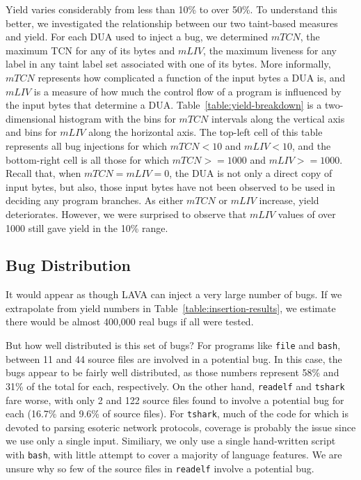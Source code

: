 Yield varies considerably from less than 10\% to over 50\%.
To understand this better, we investigated the relationship between our two taint-based measures and yield.
For each DUA used to inject a bug, we determined $mTCN$, the maximum TCN for any of its bytes and $mLIV$, the maximum liveness for any label in any taint label set associated with one of its bytes.  
More informally, $mTCN$ represents how complicated a function of the input bytes a DUA is, and $mLIV$ is a measure of how much the control flow of a program is influenced by the input bytes that determine a DUA.
Table~\ref{table:yield-breakdown} is a two-dimensional histogram with the bins for $mTCN$ intervals along the vertical axis and bins for $mLIV$ along the horizontal axis.
The top-left cell of this table represents all bug injections for which $mTCN<10$ and $mLIV<10$, and the bottom-right cell is all those for which $mTCN>=1000$ and $mLIV>=1000$.
Recall that, when  $mTCN=mLIV=0$, the DUA is not only a direct copy of input bytes, but also, those input bytes have not been observed to be used in deciding any program branches. 
As either $mTCN$ or $mLIV$ increase, yield deteriorates.  
However, we were surprised to observe that $mLIV$ values of over 1000 still gave yield in the 10\% range.

\subsection{Bug Distribution}

It would appear as though LAVA can inject a very large number of bugs.  
If we extrapolate from yield numbers in Table~\ref{table:insertion-results}, we estimate there would be almost 400,000 real bugs if all were tested.

\noindent
But how well distributed is this set of bugs? 
For programs like \verb+file+ and \verb+bash+, between 11 and 44 source files  are involved in a potential bug.
In this case, the bugs appear to be fairly well distributed, as those numbers represent 58\% and 31\% of the total for each, respectively.
On the other hand, \verb+readelf+ and \verb+tshark+ fare worse, with only 2 and 122 source files found to involve a potential bug for each (16.7\% and 9.6\% of source files).
For \verb+tshark+, much of the code for which is devoted to parsing esoteric network protocols, coverage is probably the issue since we use only a single input.
Similiary, we only use a single hand-written script with \verb+bash+, with little attempt to cover a majority of language features.
We are unsure why so few of the source files in \verb+readelf+ involve a potential bug.
 


